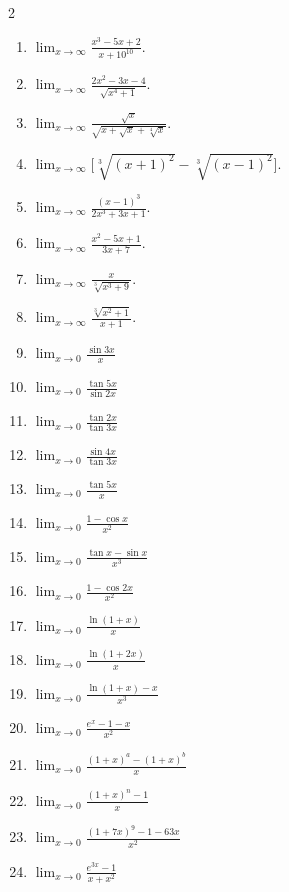 \begin{multicols}{2}
\begin{enumerate}
\item $\displaystyle \lim_{x\to \infty} \frac{x^{3}-5x+2}{x+10^{10}}.$
\item $\displaystyle \lim_{x\to \infty} \frac{2x^{2}-3x-4}{\sqrt{x^{4}+1}}.$
\item $\displaystyle \lim_{x\to \infty} \frac{\sqrt{x}}{\sqrt{x+\sqrt{x}+\sqrt[4]{x}}}.$
\item $\displaystyle \lim_{x\to \infty} \big[\sqrt[3]{(x+1)^{2}}-\sqrt[3]{(x-1)^{2}}\big].$
\item $\displaystyle \lim_{x\to \infty} \frac{(x-1)^{3}}{2x^{3}+3x+1}.$
\item $\displaystyle \lim_{x\to \infty} \frac{x^{2}-5x+1}{3x+7}.$
\item $\displaystyle \lim_{x\to \infty} \frac{x}{\sqrt[3]{x^{3}+9}}.$
\item $\displaystyle \lim_{x\to \infty} \frac{\sqrt[3]{x^{2}+1}}{x+1}.$
\item $\displaystyle \lim_{x\to 0}\frac{\sin 3x}{x}$
\item $\displaystyle \lim_{x\to 0}\frac{\tan 5x}{\sin 2x}$
\item $\displaystyle \lim_{x\to 0}\frac{\tan 2x}{\tan 3x}$
\item $\displaystyle \lim_{x\to 0}\frac{\sin 4x}{\tan 3x}$
\item $\displaystyle \lim_{x\to 0}\frac{\tan 5x}{x}$
\item $\displaystyle \lim_{x\to 0}\frac{1-\cos x}{x^{2}}$
\item $\displaystyle \lim_{x\to 0}\frac{\tan x-\sin x}{x^{3}}$
\item $\displaystyle \lim_{x\to 0}\frac{1-\cos 2x}{x^{2}}$
\item $\displaystyle \lim_{x\to 0}\frac{\ln(1+x)}{x}$
\item $\displaystyle \lim_{x\to 0}\frac{\ln(1+2x)}{x}$
\item $\displaystyle \lim_{x\to 0}\frac{\ln(1+x)-x}{x^{3}}$
\item $\displaystyle \lim_{x\to 0}\frac{e^{x}-1-x}{x^{2}}$
\item $\displaystyle \lim_{x\to 0}\frac{(1+x)^{a}-(1+x)^{b}}{x}$
\item $\displaystyle \lim_{x\to 0}\frac{(1+x)^{n}-1}{x}$
\item $\displaystyle \lim_{x\to 0}\frac{(1+7x)^{9}-1-63x}{x^{2}}$
\item $\displaystyle \lim_{x\to 0}\frac{e^{3x}-1}{x+x^{2}}$
\end{enumerate}
\end{multicols}
\newpage
